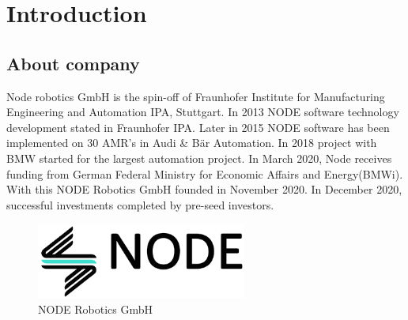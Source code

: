 
\chapter{Introduction}

\section{About company}
 Node robotics GmbH is the spin-off of Fraunhofer Institute for Manufacturing Engineering and Automation IPA, Stuttgart. In 2013 NODE software technology development stated in Fraunhofer IPA. Later in 2015 NODE software has been implemented on 30 AMR's in Audi & Bär Automation. In 2018 project with BMW started for the largest automation project. In March 2020, Node receives funding from German Federal Ministry for Economic Affairs and Energy(BMWi). With this NODE Robotics GmbH founded in November 2020. In December 2020, successful investments completed by pre-seed investors.
\begin{figure}[h]
	\begin{center}
		\includegraphics[height=2.5cm]{images/download.png}
		\caption{NODE Robotics GmbH}
	\end{center}
\end{figure}
 
